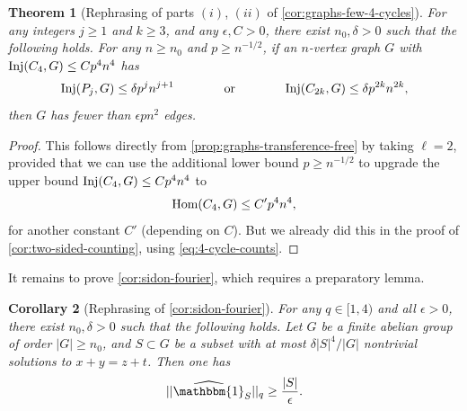 \documentclass[reqno,11pt]{amsart}
\newtheorem{theorem}{Theorem}[section]
\newtheorem{corollary}[theorem]{Corollary}
\theoremstyle{definition}
\theoremstyle{remark}
\numberwithin{equation}{section}
\newcommand{\one}{\mathbbm{1}}
\renewcommand{\hat}{\widehat}
\newcommand{\Hom}{\textnormal{Hom}}
\newcommand{\Inj}{\textnormal{Inj}}
\begin{document}
\begin{theorem}[Rephrasing of parts $(i)$, $(ii)$ of \cref{cor:graphs-few-4-cycles}]
For any integers $j \ge 1$ and $k \ge 3$, and any $\epsilon, C > 0$, there exist $n_0, \delta > 0$ such that the following holds. For any $n \ge n_0$ and $p \ge n^{-1/2}$, if an $n$-vertex graph $G$ with $\Inj(C_4,G) \le C p^{4} n^{4}$ has
\[
    \Inj(P_{j}, G) \le \delta p^{j} n^{j+1}
    \qquad\qquad \text{or} \qquad\qquad 
    \Inj(C_{2k}, G) \le \delta p^{2k} n^{2k},
\]
then $G$ has fewer than $\epsilon pn^2$ edges.
\end{theorem}

\begin{proof}
This follows directly from \cref{prop:graphs-transference-free} by taking $\ell = 2$, provided that we can use the additional lower bound $p \ge n^{-1/2}$ to upgrade the upper bound $\Inj(C_4, G) \le Cp^4 n^4$ to 
\[
    \Hom(C_4, G) \le C'p^4 n^4,
\]
for another constant $C'$ (depending on $C$). But we already did this in the proof of \cref{cor:two-sided-counting}, using \cref{eq:4-cycle-counts}.
\end{proof}


\iffalse 
It remains to prove \cref{cor:sidon-fourier}, which requires a preparatory lemma.

\begin{corollary}[Rephrasing of \cref{cor:sidon-fourier}]
For any $q \in [1, 4)$ and all $\epsilon > 0$, there exist $n_0, \delta > 0$ such that the following holds. Let $G$ be a finite abelian group of order $|G| \ge n_0$, and $S \subset G$ be a subset with at most $\delta |S|^4/|G|$ nontrivial solutions to $x + y = z + t$. Then one has
\[
    ||\hat{\one}_S||_{q} \ge \frac{|S|}{\epsilon}.
\]
\end{corollary}
\end{document}
